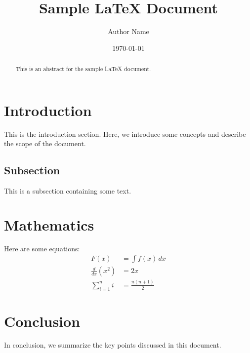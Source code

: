 \documentclass{article}
\title{Sample LaTeX Document}
\author{Author Name}
\date{\today}
\begin{document}
\maketitle

\begin{abstract}
This is an abstract for the sample LaTeX document.
\end{abstract}

\section{Introduction}
This is the introduction section. Here, we introduce some concepts and describe the scope of the document.

\subsection{Subsection}
This is a subsection containing some text.

\section{Mathematics}
Here are some equations:
\begin{align}
    F(x) &= \int f(x) \,dx \\
    \frac{d}{dx}(x^2) &= 2x \\
    \sum_{i=1}^{n} i &= \frac{n(n+1)}{2}
\end{align}

\section{Conclusion}
In conclusion, we summarize the key points discussed in this document.
\end{document}

